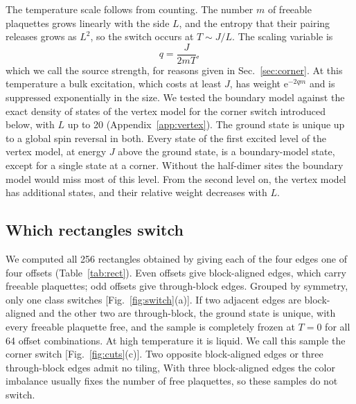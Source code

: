 \documentclass[reprint,aps,prb,floatfix,longbibliography,amsmath,amssymb]{revtex4-2}
\newcommand{\ee}{\mathrm{e}}
\begin{document}
The temperature scale follows from counting. The number $m$ of freeable plaquettes grows linearly with the side $L$, and the entropy that their pairing releases grows as $L^2$, so the switch occurs at $T\sim J/L$. The scaling variable is
\begin{equation}\label{eq:q}
  q=\frac{J}{2mT},
\end{equation}
which we call the source strength, for reasons given in Sec.~\ref{sec:corner}. At this temperature a bulk excitation, which costs at least $J$, has weight $\ee^{-2qm}$ and is suppressed exponentially in the size. We tested the boundary model against the exact density of states of the vertex model for the corner switch introduced below, with $L$ up to 20 (Appendix~\ref{app:vertex}). The ground state is unique up to a global spin reversal in both. Every state of the first excited level of the vertex model, at energy $J$ above the ground state, is a boundary-model state, except for a single state at a corner. Without the half-dimer sites the boundary model would miss most of this level. From the second level on, the vertex model has additional states, and their relative weight decreases with $L$.

\subsection{Which rectangles switch}

We computed all 256 rectangles obtained by giving each of the four edges one of four offsets (Table~\ref{tab:rect}). Even offsets give block-aligned edges, which carry freeable plaquettes; odd offsets give through-block edges. Grouped by symmetry, only one class switches [Fig.~\ref{fig:switch}(a)]. If two adjacent edges are block-aligned and the other two are through-block, the ground state is unique, with every freeable plaquette free, and the sample is completely frozen at $T=0$ for all 64 offset combinations. At high temperature it is liquid. We call this sample the corner switch [Fig.~\ref{fig:cuts}(c)]. Two opposite block-aligned edges or three through-block edges admit no tiling, With three block-aligned edges the color imbalance usually fixes the number of free plaquettes, so these samples do not switch.
\end{document}
